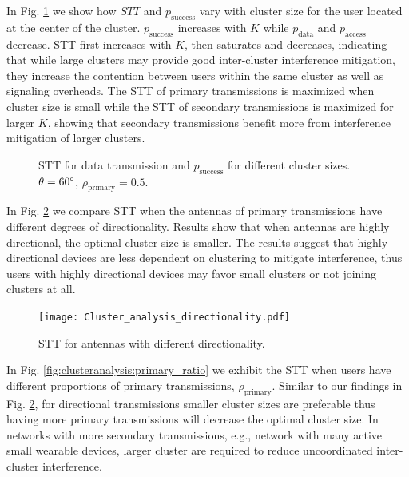 \documentclass[10pt, conference, letterpaper]{IEEEtran}
\begin{document}
In Fig. \ref{fig:clusteranalysis:basic} we show how $STT$ and $p_{\mathrm{success}}$ vary with cluster size for the user located at the center of the cluster.  
$p_{\mathrm{success}}$ increases with $K$ while $p_{\mathrm{data}}$ and $p_{\mathrm{access}}$ decrease. 
STT first increases with $K$, then saturates and decreases, indicating that while large clusters may provide good inter-cluster interference mitigation, they increase the contention between users within the same cluster as well as signaling overheads. 
The STT of primary transmissions is maximized when cluster size is small while the STT of secondary transmissions is maximized for larger $K$, showing that secondary transmissions benefit more from interference mitigation of larger clusters.

\begin{figure}[htp]
	\centering
	
	
	\caption[]{STT for data transmission  and $p_{\mathrm{success}}$  for different cluster sizes. $\theta=60\degree$, $\rho_{\mathrm{primary}} = 0.5$. }
	\label{fig:clusteranalysis:basic}
\end{figure}

In Fig. \ref{fig:clusteranalysis:directionality} we compare STT when the antennas of primary transmissions have different degrees of directionality. 
Results show that when antennas are highly directional, the optimal cluster size is smaller. 
The results suggest that highly directional devices are less dependent on clustering to mitigate interference, thus users with highly directional devices may favor small clusters or not joining clusters at all. 
\begin{figure}
	\centering
	\texttt{[image: Cluster\_analysis\_directionality.pdf]}
	\caption{STT for antennas with different directionality.}
	\label{fig:clusteranalysis:directionality}
\end{figure}

In Fig. \ref{fig:clusteranalysis:primary_ratio} we exhibit the STT when users have different proportions of primary transmissions, $\rho_{\mathrm{primary}}$. 
Similar to our findings in Fig. \ref{fig:clusteranalysis:directionality}, for directional transmissions smaller cluster sizes are preferable thus having more primary transmissions will decrease the optimal cluster size.
In networks with more secondary transmissions, e.g., network with many active small wearable devices, larger cluster are required to reduce uncoordinated inter-cluster interference. 
\end{document}
